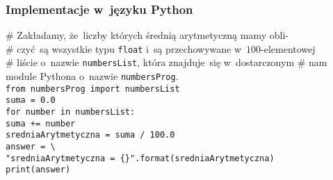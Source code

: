 \documentclass[10pt,t]{beamer}
\begin{document}
\begin{frame}
  \frametitle{Implementacje w~języku Python}


  \# Zakładamy, że~liczby których średnią arytmetyczną mamy obli- \\
  \# czyć~są wszystkie typu \texttt{float} i~są przechowywane
  w~$100$-elementowej \\
  \# liście o~nazwie \texttt{numbersList}, która znajduje~się w~dostarczonym
  \# nam module Pythona o~nazwie \texttt{numbersProg}. \\
  \vspace{0.8em}
  \texttt{from numbersProg import numbersList} \\
  \vspace{0.8em}
  \texttt{suma = 0.0} \\
  \vspace{0.8em}
  \texttt{for number in numbersList:} \\
  \hphantom{aaaa} \texttt{suma += number} \\
  \vspace{0.8em}
  \texttt{sredniaArytmetyczna = suma / 100.0} \\
  \texttt{answer = \textbackslash} \\
  \hphantom{aaa}
  \texttt{"sredniaArytmetyczna = \{\}".format(sredniaArytmetyczna)}
  \\
  \vspace{0.8em}
  \texttt{print(answer)}

\end{frame}





















\end{document}
